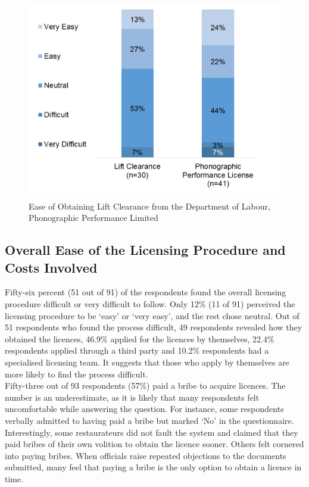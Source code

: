 \documentclass[a4paper, 12pt]{article}
\begin{document}
		\begin{figure}[H]
                    	\centering
                    	\includegraphics[height = 3.5in]{Figure5.png}
                    	\caption[Optional Caption]{Ease of Obtaining Lift Clearance from the Department of Labour, Phonographic Performance Limited}
		\end{figure}	
		
		\subsection{Overall Ease of the Licensing Procedure and Costs Involved}
		Fifty-six percent (51 out of 91) of the respondents found the overall licensing procedure difficult or very difficult to follow. Only 12\% (11 of 91) perceived the licensing procedure to be ‘easy’ or ‘very easy’, and the rest chose neutral. Out of 51 respondents 
who found the process difficult, 49 respondents revealed how they obtained the licences, 46.9\% applied for the licences by themselves, 22.4\% respondents applied through a third party and 10.2\% respondents had a specialised licensing team. It suggests that 
those who apply by themselves are more likely to find the process difficult.\\
		
		Fifty-three out of 93 respondents (57\%) paid a bribe to acquire licences. The number is an underestimate, as it is likely that many respondents felt uncomfortable while answering the question. For instance, some respondents verbally admitted to having 
paid a bribe but marked ‘No’ in the questionnaire.\\
		
		Interestingly, some restaurateurs did not fault the system and claimed that they paid bribes of their own volition to obtain the licence sooner. Others felt cornered into paying bribes. When officials raise repeated objections to the documents submitted, 
many feel that paying a bribe is the only option to obtain a licence in time.
		
\end{document}
